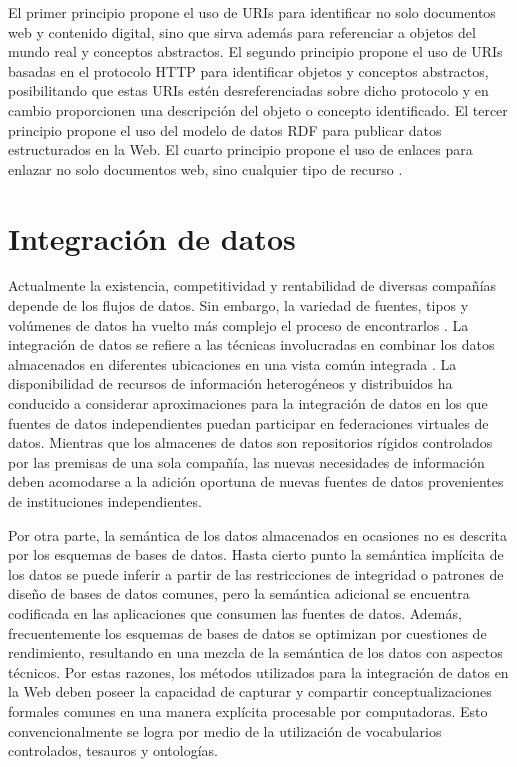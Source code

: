 El primer principio propone el uso de URIs para identificar no solo documentos web y contenido digital, sino que sirva además para referenciar a objetos del mundo real y conceptos abstractos. El segundo principio propone el uso de URIs basadas en el protocolo HTTP para identificar objetos y conceptos abstractos, posibilitando que estas URIs estén desreferenciadas sobre dicho protocolo y en cambio proporcionen una descripción del objeto o concepto identificado. El tercer principio propone el uso del modelo de datos RDF para publicar datos estructurados en la Web. El cuarto principio propone el uso de enlaces para enlazar no solo documentos web, sino cualquier tipo de recurso \citep{Hidalgo-Delgado2015}.

\section{Integración de datos}
Actualmente la existencia, competitividad y rentabilidad de diversas compañías depende de los flujos de datos. Sin embargo, la variedad de fuentes, tipos y volúmenes de datos ha vuelto más complejo el proceso de encontrarlos \citep{AloomaInc.2017}. La integración de datos se refiere a las técnicas involucradas en combinar los datos almacenados en diferentes ubicaciones en una vista común integrada \citep{Michel2017}. La disponibilidad de recursos de información heterogéneos y distribuidos ha conducido a considerar aproximaciones para la integración de datos en los que fuentes de datos independientes puedan participar en federaciones virtuales de datos. Mientras que los almacenes de datos son repositorios rígidos controlados por las premisas de una sola compañía, las nuevas necesidades de información deben acomodarse a la adición oportuna de nuevas fuentes de datos provenientes de instituciones independientes.

Por otra parte, la semántica de los datos almacenados en ocasiones no es descrita por los esquemas de bases de datos. Hasta cierto punto la semántica implícita de los datos se puede inferir a partir de las restricciones de integridad o patrones de diseño de bases de datos comunes, pero la semántica adicional se encuentra codificada en las aplicaciones que consumen las fuentes de datos. Además, frecuentemente los esquemas de bases de datos se optimizan por cuestiones de rendimiento, resultando en una mezcla de la semántica de los datos con aspectos técnicos. Por estas razones, los métodos utilizados para la integración de datos en la Web deben poseer la capacidad de capturar y compartir conceptualizaciones formales comunes en una manera explícita 
procesable por computadoras. Esto convencionalmente se logra por medio de la utilización de vocabularios controlados, tesauros y ontologías.

